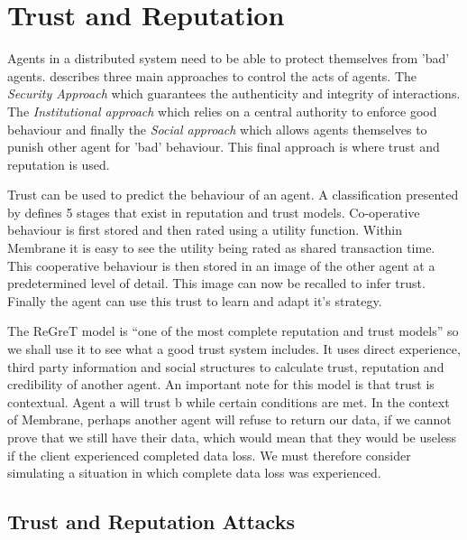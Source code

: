 \documentclass[11pt, a4paper, twocolumn, twoside]{report}
\begin{document}
\section{Trust and Reputation}

Agents in a distributed system need to be able to protect themselves from 'bad' agents. \cite{pinyol2013computational} describes three main approaches to control the acts of agents. The \emph{Security Approach} which guarantees the authenticity and integrity of interactions. The \emph{Institutional approach} which relies on a central authority to enforce good behaviour and finally the \emph{Social approach} which allows agents themselves to punish other agent for 'bad' behaviour. This final approach is where trust and reputation is used.

Trust can be used to predict the behaviour of an agent. \citep{wooldridge2009introduction} A classification presented by \cite{balke2009using} defines 5 stages that exist in reputation and trust models. Co-operative behaviour is first stored and then rated using a utility function. Within Membrane it is easy to see the utility being rated as shared transaction time. This cooperative behaviour is then stored in an image of the other agent at a predetermined level of detail. This image can now be recalled to infer trust. Finally the agent can use this trust to learn and adapt it's strategy.

The ReGreT model \citep{sabater2001regret} is ``one of the most complete reputation and trust models'' \citep{pinyol2013computational} so we shall use it to see what a good trust system includes. It uses direct experience, third party information and social structures to calculate trust, reputation and credibility of another agent. An important note for this model is that trust is contextual. Agent a will trust b while certain conditions are met. In the context of Membrane, perhaps another agent will refuse to return our data, if we cannot prove that we still have their data, which would mean that they would be useless if the client experienced completed data loss. We must therefore consider simulating a situation in which complete data loss was experienced.

\subsection{Trust and Reputation Attacks} \label{sec:tar}
\end{document}
